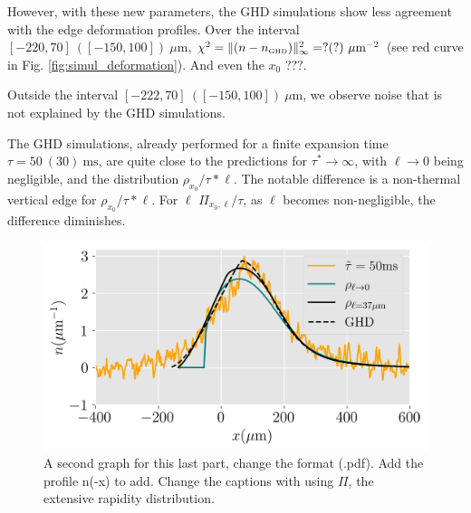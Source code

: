 \documentclass[submission, Phys]{SciPost}
\begin{document}
		However, with these new parameters, the GHD simulations show less agreement with the edge deformation profiles. Over the interval $[-220, 70]~([-150, 100])~\mu \mbox{m}$, $\chi^2 = \Vert (n - n_{\mbox{\tiny GHD}})  \Vert^2_\infty  = ? (?)~ \mu \text{m}^{-2}$ (see red curve in Fig. \ref{fig:simul_deformation}). {\color{blue} And even the $x_0$ ???}.
		

		
		
		Outside the interval $[-222, 70]~([-150, 100])~\mu \mbox{m}$, we observe noise that is not explained by the GHD simulations.

		
		
		The GHD simulations, already performed for a finite expansion time $\tau = 50~(30)~\mbox{ms}$, are quite close to the predictions for $\tau^\ast \to \infty$, with $\ell \to 0$ being negligible, and the distribution $\rho_{x_0}/\tau*\ell$. The notable difference is a non-thermal vertical edge for $\rho_{x_0}/\tau*\ell$. For $\ell$ $\Pi_{x_0 , \ell}/\tau$, as $\ell$ becomes non-negligible, the difference diminishes.
		




 \begin{figure}[!htb]
     \centering
     \includegraphics[width=0.8\linewidth]{Figures/asymetrie_GHD_all.png}
     \caption{A second graph for this last part, change the format (.pdf). Add the profile n(-x) to add. Change the captions with using $\Pi$, the extensive rapidity distribution.}
     \label{fig:local}
 \end{figure}
\end{document}
